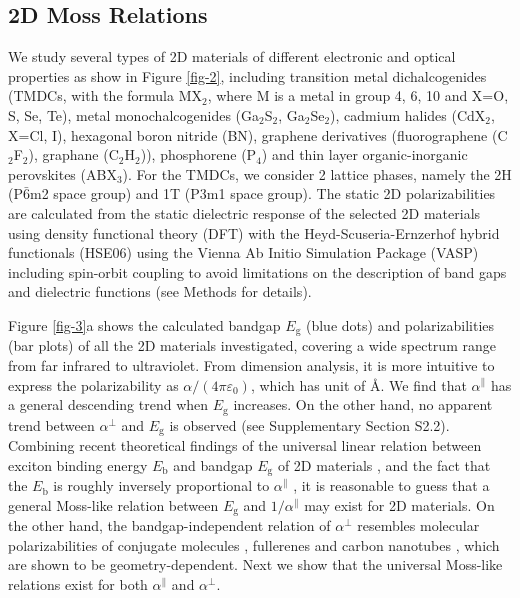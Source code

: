 \documentclass[journal=ancac3,manuscript=article,email=true,hyperref=true,keywords=false]{achemso}
\begin{document}
\subsection{2D Moss Relations}
\label{sec:first-principles}

We study several types of 2D materials of different electronic and
optical properties as show in Figure \ref{fig-2}, including transition
metal dichalcogenides (TMDCs, with the formula MX\(_{\text{2}}\),
where M is a metal in group 4, 6, 10 and X=O, S, Se, Te), metal
monochalcogenides (Ga$_{2}$S$_{2}$, Ga$_{2}$Se$_{2}$), cadmium halides
(CdX$_2$, X=Cl, I), hexagonal boron nitride (BN), graphene derivatives
(fluorographene (C$_{2}$F$_{2}$), graphane (C$_{2}$H$_{2}$)),
phosphorene (P$_{4}$) and thin layer organic-inorganic perovskites
(ABX$_{3}$).  For the TMDCs, we consider 2 lattice phases, namely the
2H (P\(\bar{6}\)m2 space group) and 1T (P3m1 space group).  The static
2D polarizabilities are calculated from the static dielectric response
of the selected 2D materials using density functional theory (DFT)
with the Heyd-Scuseria-Ernzerhof hybrid functionals (HSE06) using the
Vienna Ab Initio Simulation Package (VASP) including spin-orbit
coupling to avoid limitations on the description of band gaps and
dielectric functions (see Methods for details).

Figure \ref{fig-3}a shows the calculated bandgap $E_{\mathrm{g}}$
(blue dots) and polarizabilities (bar plots) of all the 2D materials
investigated, covering a wide spectrum range from far infrared to
ultraviolet. From dimension analysis, it is more intuitive to express
the polarizability as $\alpha/(4 \pi \varepsilon_{0})$, which has unit
of \AA. We find that $\alpha^{\parallel}$ has a general descending
trend when $E_{\mathrm{g}}$ increases. On the other hand, no apparent
trend between $\alpha^{\perp}$ and $E_{\mathrm{g}}$ is observed (see
Supplementary Section S2.2).  Combining recent theoretical findings of
the universal linear relation between exciton binding energy
$E_{\mathrm{b}}$ and bandgap $E_{\mathrm{g}}$ of 2D materials
\cite{Choi_linear_2015,Olsen_2016_hydrogen,Jiang_2017_Eg_Eb}, and the
fact that the $E_{\mathrm{b}}$ is roughly inversely proportional to
$\alpha^{\parallel}$ \cite{Pulci_2014}, it is reasonable to guess that
a general Moss-like relation between $E_{\mathrm{g}}$ and
$1/\alpha^{\parallel}$ may exist for 2D materials. On the other hand,
the bandgap-independent relation of $\alpha^{\perp}$ resembles
molecular polarizabilities of conjugate molecules \cite{Davies_1952},
fullerenes \cite{Sabirov_2014} and carbon nanotubes
\cite{Benedict_1995}, which are shown to be geometry-dependent. Next
we show that the universal Moss-like relations exist for both
$\alpha^{\parallel}$ and $\alpha^{\perp}$.
\end{document}
